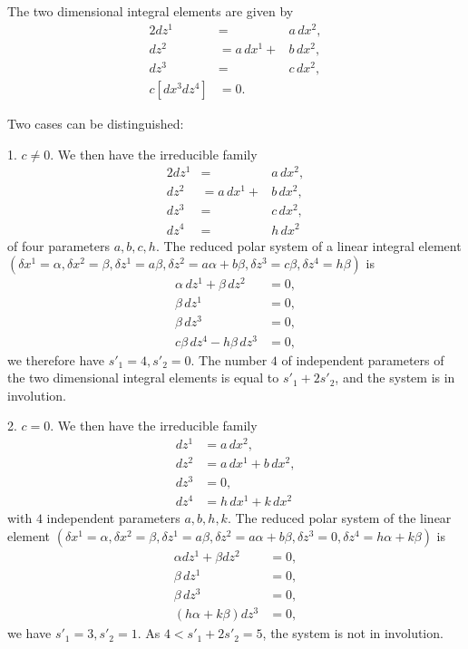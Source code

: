 The two dimensional integral elements are given by
\begin{alignat*}{2}
  dz^{1}&=&a\,dx^{2},\\
  dz^{2}&=a\,dx^{1}+&b\,dx^{2},\\
  dz^{3}&=&c\,dx^{2},\\
  c[dx^{3}dz^{4}]&=0.&
\end{alignat*}

Two cases can be distinguished:

1. $c\neq 0$. We then have the irreducible family
\begin{alignat*}{2}
  dz^{1}&=&a\,dx^{2},\\
  dz^{2}&=a\,dx^{1}+&b\,dx^{2},\\
  dz^{3}&=&c\,dx^{2},\\
  dz^{4}&=&h\,dx^{2}
\end{alignat*}
of four parameters $a,b,c,h$. The reduced polar system of a linear integral element $(\delta x^{1}=\alpha,\delta x^{2}=\beta,\delta z^{1}=a\beta,\delta z^{2}=a\alpha+b\beta,\delta z^{3}=c\beta,\delta z^{4}=h\beta)$ is
\begin{align*}
  \alpha\,dz^{1}+\beta\,dz^{2}&=0,\\
  \beta\,dz^{1}&=0,\\
  \beta\,dz^{3}&=0,\\
  c\beta\,dz^{4}-h\beta\,dz^{3}&=0,
\end{align*}
we therefore have $s'_{1}=4,s'_{2}=0$. The number $4$ of independent parameters of the two dimensional integral elements is equal to $s'_{1}+2s'_{2}$, and the system is in involution.

2. $c=0$. We then have the irreducible family
\begin{align*}
  dz^{1}&=a\,dx^{2},\\
  dz^{2}&=a\,dx^{1}+b\,dx^{2},\\
  dz^{3}&=0,\\
  dz^{4}&=h\,dx^{1}+k\,dx^{2}
\end{align*}
with $4$ independent parameters $a,b,h,k$. The reduced polar system of the linear element $(\delta x^{1}=\alpha,\delta x^{2}=\beta,\delta z^{1}=a\beta,\delta z^{2}=a\alpha+b\beta, \delta z^{3}=0,\delta z^{4}=h\alpha+k\beta)$ is
\begin{align*}
  \alpha dz^{1}+\beta dz^{2}&=0,\\
  \beta\,dz^{1}&=0,\\
  \beta\,dz^{3}&=0,\\
  (h\alpha+k\beta)dz^{3}&=0,
\end{align*}
we have $s'_{1}=3,s'_{2}=1$. As $4<s'_{1}+2s'_{2}=5$, the system is not in involution. 


